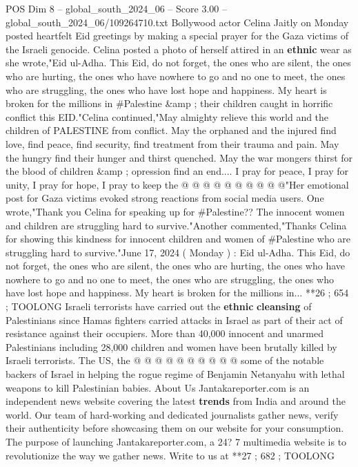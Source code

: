 \begin{textsample}{POS Dim 8 – global\_south\_2024\_06 – Score 3.00 – global\_south\_2024\_06/109264710.txt}  \label{ex:f8_pos_405}
Bollywood actor Celina Jaitly on Monday posted heartfelt Eid greetings by making a special prayer for the Gaza victims of the Israeli genocide.
Celina posted a photo of herself attired in an \textbf{ethnic} wear as she wrote,"Eid ul-Adha.
This Eid, do not forget, the ones who are silent, the ones who are hurting, the ones who have nowhere to go and no one to meet, the ones who are struggling, the ones who have lost hope and happiness.
My heart is broken for the millions in \#Palestine \&amp ; their children caught in horrific conflict this EID."Celina continued,"May almighty relieve this world and the children of PALESTINE from conflict.
May the orphaned and the injured find love, find peace, find security, find treatment from their trauma and pain.
May the hungry find their hunger and thirst quenched.
May the war mongers thirst for the blood of children \&amp ; opression find an end....
I pray for peace, I pray for unity, I pray for hope, I pray to keep the @ @ @ @ @ @ @ @ @ @"Her emotional post for Gaza victims evoked strong reactions from social media users.
One wrote,"Thank you Celina for speaking up for \#Palestine??
The innocent women and children are struggling hard to survive."Another commented,"Thanks Celina for showing this kindness for innocent children and women of \#Palestine who are struggling hard to survive."June 17, 2024 ( Monday ) : Eid ul-Adha.
This Eid, do not forget, the ones who are silent, the ones who are hurting, the ones who have nowhere to go and no one to meet, the ones who are struggling, the ones who have lost hope and happiness.
My heart is broken for the millions in... **26 ; 654 ; TOOLONG Israeli terrorists have carried out the \textbf{ethnic} \textbf{cleansing} of Palestinians since Hamas fighters carried attacks in Israel as part of their act of resistance against their occupiers.
More than 40,000 innocent and unarmed Palestinians including 28,000 children and women have been brutally killed by Israeli terrorists.
The US, the @ @ @ @ @ @ @ @ @ @ some of the notable backers of Israel in helping the rogue regime of Benjamin Netanyahu with lethal weapons to kill Palestinian babies.
About Us Jantakareporter.com is an independent news website covering the latest \textbf{trends} from India and around the world.
Our team of hard-working and dedicated journalists gather news, verify their authenticity before showcasing them on our website for your consumption.
The purpose of launching Jantakareporter.com, a 24? 7 multimedia website is to revolutionize the way we gather news.
Write to us at **27 ; 682 ; TOOLONG

\end{textsample}

